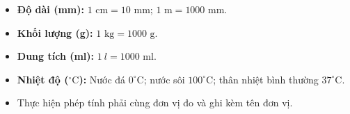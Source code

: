 \documentclass[11pt,a4paper]{article}
\begin{document}
\begin{minipage}[t]{0.49\textwidth}\vspace{0pt}
\begin{tcolorbox}[
  enhanced,
  colback=teal!4!white,
  colframe=teal!75!black,
  arc=2mm, boxrule=0.8pt,
  left=2mm, right=2mm, top=1.8mm, bottom=1.8mm,
  title={\footnotesize\bfseries\color{white}\faBalanceScale\ 2. Trọng tâm Đo lường HK1}
]
{\footnotesize
\begin{itemize}\setlength{\itemsep}{1.5pt}\setlength{\leftskip}{-2.5mm}
  \item \textbf{Độ dài (mm):} $1\text{ cm} = 10\text{ mm}$; $1\text{ m} = 1000\text{ mm}$.
  \item \textbf{Khối lượng (g):} $1\text{ kg} = 1000\text{ g}$.
  \item \textbf{Dung tích (ml):} $1\ l = 1000\text{ ml}$.
  \item \textbf{Nhiệt độ ($^\circ\text{C}$):} Nước đá $0^\circ\text{C}$; nước sôi $100^\circ\text{C}$; thân nhiệt bình thường $37^\circ\text{C}$.
  \item Thực hiện phép tính phải cùng đơn vị đo và ghi kèm tên đơn vị.
\end{itemize}
}
\end{tcolorbox}
\end{minipage}
\end{document}
